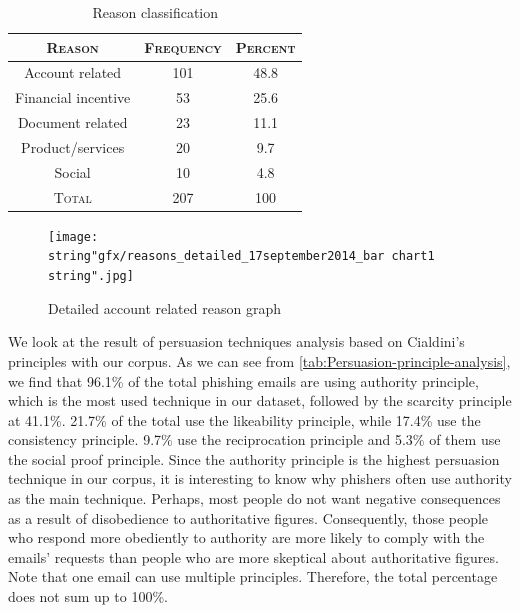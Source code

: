 \begin{table}[h]
\centering{}%
\begin{tabular}{ccc}
\toprule 
\textsc{\small{}Reason} & \textsc{\small{}Frequency} & \textsc{\small{}Percent}\tabularnewline
\midrule
\midrule 
{\small{}Account related} & {\small{}101} & 48.8\tabularnewline
\midrule 
{\small{}Financial incentive} & {\small{}53} & 25.6\tabularnewline
\midrule 
{\small{}Document related} & {\small{}23} & {\small{}11.1}\tabularnewline
\midrule 
Product/services & 20 & 9.7\tabularnewline
\midrule 
Social  & 10 & 4.8\tabularnewline
\midrule
\midrule 
\textsc{\small{}Total} & 207 & 100\tabularnewline
\bottomrule
\end{tabular}\protect\caption{\label{tab:Reason-classification}Reason classification}
\end{table}


\begin{figure}[h]
%


%
\begin{centering}
\texttt{[image: \\string"gfx/reasons\_detailed\_17september2014\_bar chart1\\string".jpg]}\protect\caption{\label{fig:Detailed-account-related}Detailed account related reason
graph}

\par\end{centering}

%
%
\end{figure}


We look at the result of persuasion techniques analysis based on Cialdini's
principles with our corpus. As we can see from \autoref{tab:Persuasion-principle-analysis},
we find that 96.1\% of the total phishing emails are using authority
principle, which is the most used technique in our dataset, followed
by the scarcity principle at 41.1\%. 21.7\% of the total use the likeability
principle, while 17.4\% use the consistency principle. 9.7\% use the
reciprocation principle and 5.3\% of them use the social proof principle.
Since the authority principle is the highest persuasion technique
in our corpus, it is interesting to know why phishers often use authority
as the main technique. Perhaps, most people do not want negative consequences
as a result of disobedience to authoritative figures. Consequently,
those people who respond more obediently to authority are more likely
to comply with the emails\textquoteright{} requests than people who
are more skeptical about authoritative figures. Note that one email
can use multiple principles. Therefore, the total percentage does
not sum up to 100\%.

